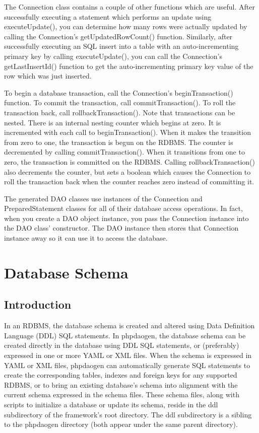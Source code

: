 \documentclass[letterpaper,10pt,english]{sphinxmanual}
\begin{document}
The Connection class contains a couple of other functions which are useful.  After successfully
executing a statement which performs an update using executeUpdate(), you can determine how many
rows were actually updated by calling the Connection's getUpdatedRowCount() function.  Similarly,
after successfully executing an SQL insert into a table with an auto-incrementing primary key by
calling executeUpdate(), you can call the Connection's getLastInsertId() function to get the
auto-incrementing primary key value of the row which was just inserted.

To begin a database transaction, call the Connection's beginTransaction() function.  To commit the
transaction, call commitTransaction().  To roll the transaction back, call rollbackTransaction().
Note that transactions can be nested.  There is an internal nesting counter which begins at zero.
It is incremented with each call to beginTransaction().  When it makes the transition from zero to
one, the transaction is begun on the RDBMS.  The counter is decremented by calling
commitTransaction().  When it transitions from one to zero, the transaction is committed on the
RDBMS.  Calling rollbackTransaction() also decrements the counter, but sets a boolean which causes
the Connection to roll the transaction back when the counter reaches zero instead of committing it.

The generated DAO classes use instances of the Connection and PreparedStatement classes for all of
their database access operations.  In fact, when you create a DAO object instance, you pass the
Connection instance into the DAO class' constructor.  The DAO instance then stores that Connection
instance away so it can use it to access the database.


\section{Database Schema}
\label{jaxFrameworkGuide:database-schema}

\subsection{Introduction}
\label{jaxFrameworkGuide:id15}
In an RDBMS, the database schema is created and altered using Data Definition Language (DDL) SQL
statements.  In phpdaogen, the database schema can be created directly in the database using DDL SQL
statements, or (preferably) expressed in one or more YAML or XML files.  When the schema is
expressed in YAML or XML files, phpdaogen can automatically generate SQL statements to create the
corresponding tables, indexes and foreign keys for any supported RDBMS, or to bring an existing
database's schema into alignment with the current schema expressed in the schema files.  These
schema files, along with scripts to initialize a database or update its schema, reside in the ddl
subdirectory of the framework's root directory.  The ddl subdirectory is a sibling to the phpdaogen
directory (both appear under the same parent directory).
\end{document}
